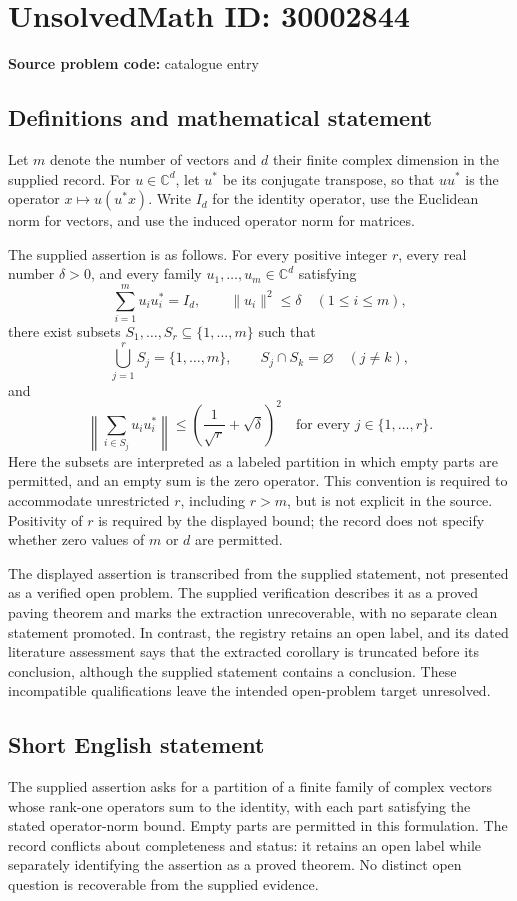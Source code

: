 \documentclass[11pt]{article}
\newcommand{\C}{\mathbb{C}}
\begin{document}
\section*{UnsolvedMath ID: 30002844}
\textbf{Source problem code:} catalogue entry
\subsection{Definitions and mathematical statement}
Let \(m\) denote the number of vectors and \(d\) their finite complex dimension in the supplied record. For \(u\in\C^d\), let \(u^*\) be its conjugate transpose, so that \(uu^*\) is the operator \(x\mapsto u(u^*x)\). Write \(I_d\) for the identity operator, use the Euclidean norm for vectors, and use the induced operator norm for matrices.

The supplied assertion is as follows. For every positive integer \(r\), every real number \(\delta>0\), and every family \(u_1,\ldots,u_m\in\C^d\) satisfying
\[
\sum_{i=1}^{m}u_i u_i^*=I_d,
\qquad
\|u_i\|^2\leq\delta\quad(1\leq i\leq m),
\]
there exist subsets \(S_1,\ldots,S_r\subseteq\{1,\ldots,m\}\) such that
\[
\bigcup_{j=1}^{r}S_j=\{1,\ldots,m\},
\qquad
S_j\cap S_k=\varnothing\quad(j\neq k),
\]
and
\[
\left\|\sum_{i\in S_j}u_i u_i^*\right\|
\leq
\left(\frac{1}{\sqrt r}+\sqrt\delta\right)^2
\quad\text{for every }j\in\{1,\ldots,r\}.
\]
Here the subsets are interpreted as a labeled partition in which empty parts are permitted, and an empty sum is the zero operator. This convention is required to accommodate unrestricted \(r\), including \(r>m\), but is not explicit in the source. Positivity of \(r\) is required by the displayed bound; the record does not specify whether zero values of \(m\) or \(d\) are permitted.

The displayed assertion is transcribed from the supplied statement, not presented as a verified open problem. The supplied verification describes it as a proved paving theorem and marks the extraction unrecoverable, with no separate clean statement promoted. In contrast, the registry retains an open label, and its dated literature assessment says that the extracted corollary is truncated before its conclusion, although the supplied statement contains a conclusion. These incompatible qualifications leave the intended open-problem target unresolved.
\subsection{Short English statement}
The supplied assertion asks for a partition of a finite family of complex vectors whose rank-one operators sum to the identity, with each part satisfying the stated operator-norm bound. Empty parts are permitted in this formulation. The record conflicts about completeness and status: it retains an open label while separately identifying the assertion as a proved theorem. No distinct open question is recoverable from the supplied evidence.
\end{document}

